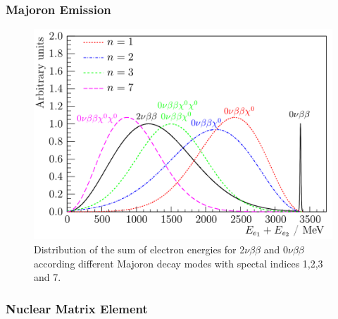 \documentclass[main.tex]{subfiles}
\begin{document}
\FloatBarrier

\subsubsection{Majoron Emission}


\begin{figure}[h!]
\begin{center}
\includegraphics[scale=0.25]{pictures/Chap2/SpectrumFifferentMechanism.png}
\caption{Distribution of the sum of electron energies for 2$\nu\beta\beta$ and 0$\nu\beta\beta$ according different Majoron decay modes with spectal indices 1,2,3 and 7.}
\label{DifferentbbDecaySpectrum}
\end{center}
\end{figure}

\FloatBarrier

\subsubsection{Nuclear Matrix Element}
\end{document}
